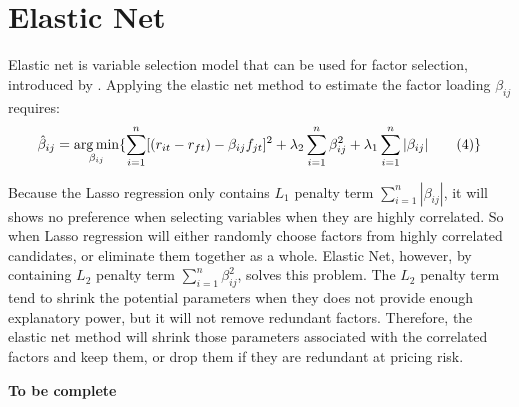 	\section{Elastic Net}\label{Elastic_Net}

Elastic net  is variable selection model that can be used for factor selection, introduced by . Applying the elastic net method to estimate the factor loading $\beta_{ij}$ requires:
	\[   \hat{\beta}_{ij}  = \operatorname*{arg\,min}_{\beta_{ij}}\{\sum_{i = 1}^{n}[(r_{it} - r_{ft}) - \beta_{ij }f_{jt}]^2 + \lambda_2\sum_{i = 1}^{n}\beta_{ij}^2  + \lambda_1\sum_{i = 1}^{n}|\beta_{ij}|  \label{ENcriterion} \tag{4}   \}    \]
	
	
	
Because the Lasso regression only contains $L_1$ penalty term $\sum_{i = 1}^{n} |\beta_{ij}|$, it will shows no preference when selecting variables when they are highly correlated.
So when Lasso regression will either randomly choose factors from highly correlated candidates, or eliminate them together as a whole.  
Elastic Net, however, by containing $L_2$ penalty term $\sum_{i=1}^{n}\beta_{ij}^2$, solves this problem. 
The $L_2$ penalty term tend to shrink the potential parameters when they does not provide enough explanatory power, but it will not remove redundant factors.
Therefore, the elastic net method will shrink those parameters associated with the correlated factors and keep them, or drop them if they are redundant at pricing risk. 
	
{\bf To be complete}
